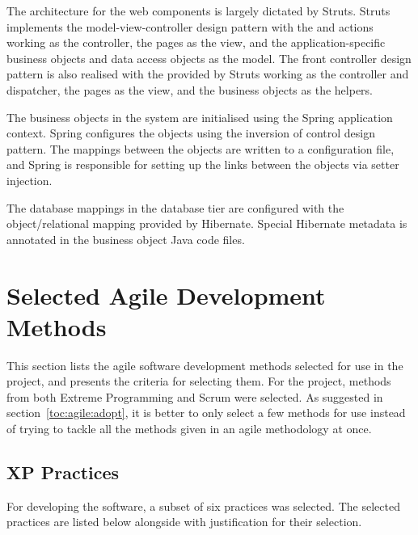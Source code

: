 The architecture for the web components is largely dictated by Struts. 
Struts implements the model-view-controller design pattern with the 
 and actions working as the controller, the 
 pages as the view, and the application-specific business 
objects and data access objects as the model. The front controller 
design pattern is also realised with the  
provided by Struts working as the controller and dispatcher, the 
 pages as the view, and the business objects as the 
helpers.

The business objects in the system are initialised using the Spring 
application context. Spring configures the objects using the inversion 
of control design pattern. The mappings between the objects are 
written to a configuration file, and Spring is responsible for setting 
up the links between the objects via setter injection.

The database mappings in the database tier are configured with the 
object/relational mapping provided by Hibernate. Special Hibernate 
metadata is annotated in the business object Java code files.


\section{Selected Agile Development Methods}
\label{toc:selected:agile}

This section lists the agile software development methods selected for 
use in the project, and presents the criteria for selecting them. For 
the project, methods from both Extreme Programming and Scrum were 
selected. As suggested in section~\ref{toc:agile:adopt}, it is better 
to only select a few methods for use instead of trying to tackle all 
the methods given in an agile methodology at once.


\subsection{XP Practices}
\label{toc:selected:agile:xp}

For developing the software, a subset of six  practices was 
selected. The selected practices are listed below alongside with 
justification for their selection.

